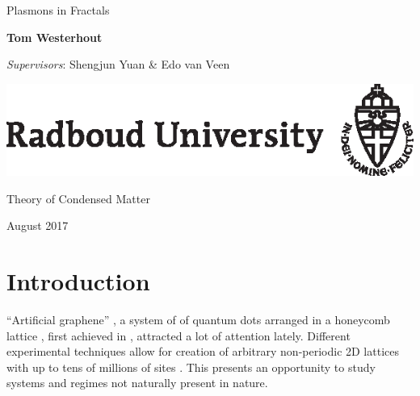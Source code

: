 \documentclass[a4paper,12pt]{article}
\begin{document}
\begin{titlepage}
    \begin{center}
        \vspace*{3cm}
   
        {\ttfamily\LARGE Plasmons in Fractals\par}
        
        \vspace{1.5cm}
        
        {\ttfamily\large\textbf{Tom Westerhout} \par}
        
        \vspace{0.5cm}

        {\ttfamily\textit{Supervisors}: Shengjun Yuan \& Edo van Veen}
        
        \vfill
        
        
        \hbox{\hspace{5.6cm}\includegraphics{ru_e_a4_zwart_2014.eps}}
        
        {\ttfamily Theory of Condensed Matter \par}
        { August 2017}

        \vspace{2cm}
        
    \end{center}
\end{titlepage}

\begin{center}
    
\end{center}

\tableofcontents

\newpage

\section{Introduction}
    ``Artificial graphene'' , a system of of quantum dots  arranged in a honeycomb lattice , first achieved in \cite{engineering2009}, attracted a lot of attention lately. Different experimental techniques \cite{artificial2013} allow for creation of arbitrary non-periodic 2D lattices  with up to tens of millions of sites . This presents an opportunity to study systems and regimes not naturally present in nature.
    
\end{document}
